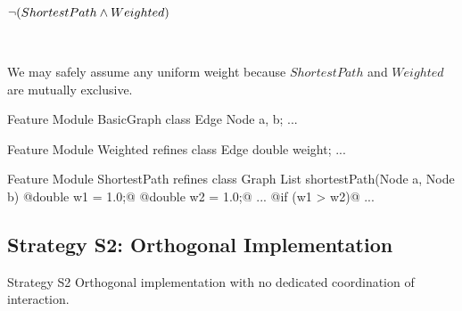 \begin{frame}[fragile]{\myframetitle}
	\begin{mycolumns}[animation=none]
		\centering

		$\neg (ShortestPath \wedge Weighted)$  

		~
		\begin{note}{}
			We may safely assume any uniform weight because $ShortestPath$ and $Weighted$ are mutually exclusive.
		\end{note}
	\mynextcolumn
\begin{codetight}{Feature Module BasicGraph}
class Edge {
	Node a, b; ...
}
\end{codetight}	
\begin{codetight}{Feature Module Weighted}
refines class Edge {
	double weight; ...
}
\end{codetight}	
\begin{codetight}{Feature Module ShortestPath}
refines class Graph {
	List shortestPath(Node a, Node b){
		@double w1 = 1.0;@
		@double w2 = 1.0;@
		...
		@if (w1 > w2)@
		... 
	}
}
\end{codetight}	
	\end{mycolumns}
\end{frame}

\subsection{Strategy S2: Orthogonal Implementation}

\begin{frame}{\myframetitle}
	\begin{mycolumns}[widths={30},animation=none]
		\begin{definition}{Strategy S2}
			Orthogonal implementation with no dedicated coordination of interaction.
		\end{definition}
	\mynextcolumn
	\end{mycolumns}
\end{frame}

